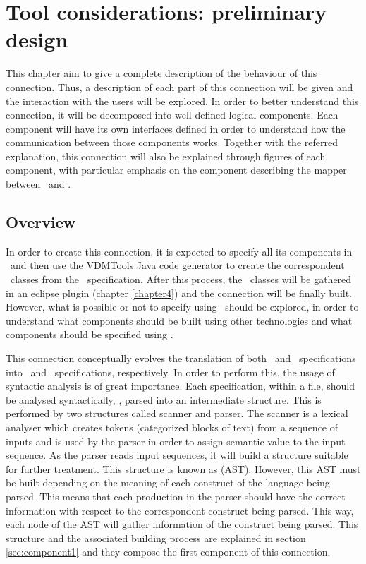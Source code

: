 \chapter{Tool considerations: preliminary design}
\label{sec:chapter4}

This chapter aim to give a complete description of the behaviour of this connection. Thus, a description of each part of this connection will be given and the interaction with the users will be explored. In order to better understand this connection, it will be decomposed into well defined logical components. Each component will have its own interfaces defined in order to understand how the communication between those components works. Together with the referred explanation, this connection will also be explained through figures of each component, with particular emphasis on the component describing the mapper between \vpp\ and \jml.

\section{Overview}

In order to create this connection, it is expected to specify all its components in \vpp\ and then use the VDMTools Java code generator to create the correspondent \java\ classes from the \vpp\ specification. After this process, the \java\ classes will be gathered in an eclipse plugin (chapter \ref{chapter4}) and the connection will be finally built. However, what is possible or not to specify using \vpp\ should be explored, in order to understand what components should be built using other technologies and what components should be specified using \vpp. 

This connection conceptually evolves the translation of both \vpp\ and \jml\ specifications into \jml\ and \vpp\ specifications, respectively. In order to perform this, the usage of syntactic analysis is of great importance. Each specification, within a file, should be analysed syntactically, \ie, parsed into an intermediate structure. This is performed by two structures called scanner and parser. The scanner is a lexical analyser which creates tokens (categorized blocks of text) from a sequence of inputs and is used by the parser in order to assign semantic value to the input sequence. As the parser reads input sequences, it will build a structure suitable for further treatment. This structure is known as  (AST\label{sym:AST}). However, this AST must be built depending on the meaning of each construct of the language being parsed. This means that each production in the parser should have the correct information with respect to the correspondent construct being parsed. This way, each node of the AST will gather information of the construct being parsed. This structure and the associated building process are explained in section \ref{sec:component1} and they compose the first component of this connection. 

